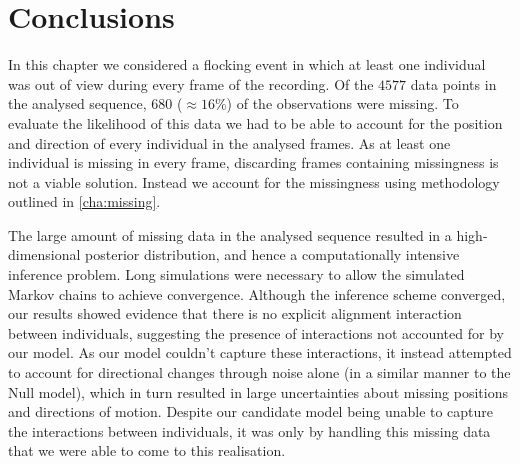 \section*{Conclusions}

In this chapter we considered a flocking event in which at least one individual
was out of view during every frame of the recording. Of the $4577$ data
points in the analysed sequence, $680$ ($\approx16\%$) of the observations were
missing. To evaluate the likelihood of this data we had to be able to account
for the position and direction of every individual in the analysed frames. As
at least one individual is missing in every frame, discarding frames containing
missingness is not a viable solution. Instead we account for the missingness
using methodology outlined in \cref{cha:missing}.

The large amount of missing data in the analysed sequence resulted in a
high-dimensional posterior distribution, and hence a computationally intensive
inference problem. Long simulations were necessary to allow the simulated
Markov chains to achieve convergence. Although the inference scheme converged,
our results showed evidence that there is no explicit alignment interaction
between individuals, suggesting the presence of interactions not accounted for
by our model. As our model couldn't capture these interactions, it instead
attempted to account for directional changes through noise alone (in a similar
manner to the Null model), which in turn resulted in large uncertainties about
missing positions and directions of motion. Despite our candidate model being
unable to capture the interactions between individuals, it was only by handling
this missing data that we were able to come to this realisation.
